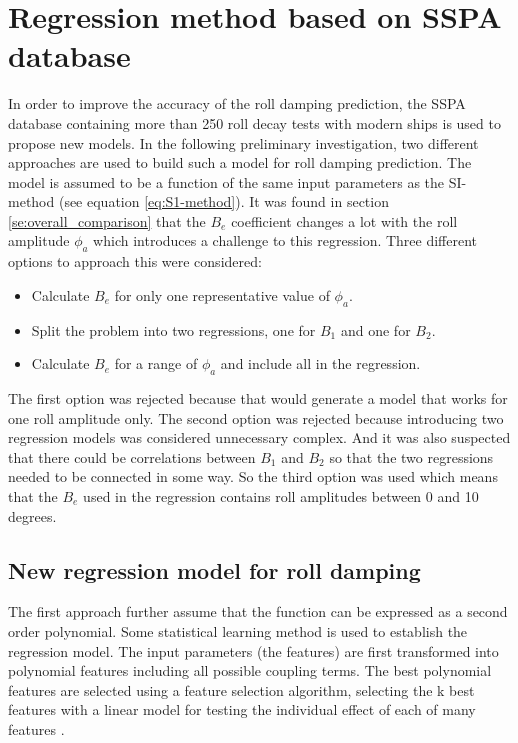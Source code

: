 \section{Regression method based on SSPA database}
\label{se:correction_SI_method}
In order to improve the accuracy of the roll damping prediction, the SSPA database containing more than 250 roll decay tests with modern ships is used to propose new models. In the following preliminary investigation, two different approaches are used to build such a model for roll damping prediction. The model is assumed to be a function of the same input parameters as the SI-method (see equation \ref{eq:S1-method}). It was found in section \ref{se:overall_comparison} that the $B_e$ coefficient changes a lot with the roll amplitude $\phi_a$ which introduces a challenge to this regression. Three different options to approach this were considered:
\begin{itemize}
    \item Calculate $B_e$ for only one representative value of $\phi_a$.
    \item Split the problem into two regressions, one for $B_1$ and one for $B_2$.
    \item Calculate $B_e$ for a range of $\phi_a$ and include all in the regression.
\end{itemize}
The first option was rejected because that would generate a model that works for one roll amplitude only. The second option was rejected because introducing two regression models was considered unnecessary complex. And it was also suspected that there could be correlations between $B_1$ and $B_2$ so that the two regressions needed to be connected in some way. So the third option was used which means that the $B_e$ used in the regression contains roll amplitudes between 0 and 10 degrees.  

\subsection{New regression model for roll damping}
The first approach further assume that the function can be expressed as a second order polynomial. Some statistical learning method is used to establish the regression model. The input parameters (the features) are first transformed into polynomial features including all possible coupling terms. The best polynomial features are selected using a feature selection algorithm, selecting the k best features \parencite[]{noauthor_sklearnfeature_selectionselectkbest_nodate} with a linear model for testing the individual effect of each of many features \parencite[]{noauthor_sklearnfeature_selectionf_regression_nodate}. 

